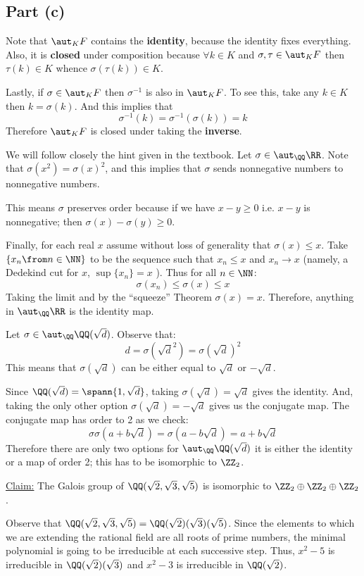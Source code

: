 \subsection*{Part (c)}
Note that $\aut_K F$ contains the \textbf{identity}, because the identity fixes everything. Also, it is \textbf{closed} under composition because  $\forall k\in K$ and $\sigma,\tau\in \aut_K F$ then $\tau(k)\in K$ whence $\sigma(\tau(k))\in K$. 

Lastly, if $\sigma\in \aut_KF$ then $\sigma^{-1}$ is also in $\aut_K F$. To see this, take any $k\in K$ then $k= \sigma(k)$.  And this implies that 
$$\sigma^{-1}(k) = \sigma^{-1}(\sigma(k)) = k$$
Therefore $\aut_K F$ is closed under taking the \textbf{inverse}.
    

We will follow closely the hint given in the textbook. Let $\sigma\in \aut_\QQ \RR$. Note that $\sigma(x^2) = \sigma(x)^2$, and this implies that $\sigma$ sends nonnegative numbers to nonnegative numbers. 

This means $\sigma$ preserves order because if we have $x-y\geq 0$ i.e. $x-y$ is nonnegative; then $\sigma(x) - \sigma(y)\geq 0$.

Finally, for each real $x$ assume without loss of generality that $\sigma(x)\leq x$. Take $\{x_n \from n\in \NN\}$ to be the sequence such that $x_n\leq x$ and $x_n\to x$ (namely, a Dedekind cut for $x$, $\sup\{x_n\} =x$ ). Thus for all $n\in \NN$:
$$\sigma(x_n)\leq \sigma(x)\leq x$$
Taking the limit and by the ``squeeze'' Theorem $\sigma(x) = x$. Therefore, anything in $\aut_\QQ \RR$ is the identity map.

Let $\sigma \in \aut_\QQ\QQ(\sqrt d)$. Observe that:
$$d= \sigma(\sqrt d^2)= \sigma(\sqrt d)^2 $$
This means that $\sigma(\sqrt d)$ can be either equal to $\sqrt d$ or $-\sqrt d$. 

Since $\QQ(\sqrt d)= \spann\{ 1,\sqrt{d}\}$, taking $\sigma(\sqrt{d}) =\sqrt{d}$ gives the identity. And, taking the only other option $\sigma(\sqrt{d}) =-\sqrt{d}$ gives us the conjugate map. The conjugate map has order to 2 as we check:
$$\sigma\sigma(a+ b\sqrt{d}) = \sigma(a-b\sqrt{d}) = a+b\sqrt{d}$$
Therefore there are only two options for $\aut_\QQ \QQ(\sqrt{d})$ it is either the identity or a map of order 2; this has to be isomorphic to $\ZZ_2$.


\underline{Claim:} The Galois group of $\QQ(\sqrt 2, \sqrt 3, \sqrt 5)$ is isomorphic to $\ZZ_2\oplus \ZZ_2 \oplus \ZZ_2$.

Observe that   $\QQ(\sqrt 2, \sqrt 3, \sqrt 5)=\QQ(\sqrt 2)( \sqrt 3) (\sqrt 5)$. Since the elements to which we are extending the rational field are all roots of prime numbers, the minimal polynomial is going to be irreducible at each successive step. Thus, $x^2-5$ is irreducible in $\QQ(\sqrt 2)( \sqrt 3)$ and $x^2-3$ is irreducible in $\QQ(\sqrt 2)$.

